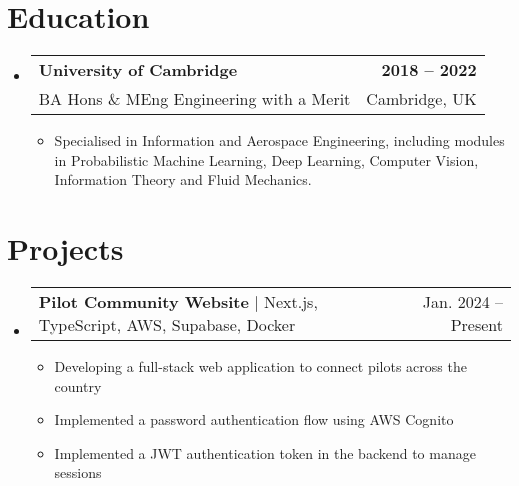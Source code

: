\documentclass[letterpaper,10pt]{article}
\makeatletter
\newcommand{\resumeItem}[1]{
  \item\small{
    {#1 \vspace{-2pt}}
  }
}
\newcommand{\educationItem}[4]{
  \vspace{-2pt}
  \item
  \begin{tabular*}{0.97\textwidth}[t]{l@{\extracolsep{\fill}}r}
    \textbf{#1} & \textbf{#2} \\
    \small#3 & \small#4
  \end{tabular*}\vspace{-7pt}
}
\newcommand{\resumeProjectHeading}[2]{
    \item
    \begin{tabular*}{0.97\textwidth}{l@{\extracolsep{\fill}}r}
      \small#1 & #2 \\
    \end{tabular*}\vspace{-7pt}
}
\newcommand{\resumeSubHeadingListStart}{\begin{itemize}[leftmargin=0.15in, label={}]}
\newcommand{\resumeSubHeadingListEnd}{\end{itemize}}
\newcommand{\resumeItemListStart}{\begin{itemize}}
\newcommand{\resumeItemListEnd}{\end{itemize}\vspace{-5pt}}
\makeatother
\begin{document}
\section{Education}
  \resumeSubHeadingListStart
    \educationItem
      {University of Cambridge}
      {2018 -- 2022}
      {BA Hons \& MEng Engineering with a Merit}
      {Cambridge, UK}
    \resumeItemListStart
      \resumeItem{Specialised in Information and Aerospace Engineering, including modules in Probabilistic Machine Learning, Deep Learning, Computer Vision, Information Theory and Fluid Mechanics.}
    \resumeItemListEnd
  \resumeSubHeadingListEnd

  \section{Projects}
  \resumeSubHeadingListStart
    \resumeProjectHeading
        {\textbf{Pilot Community Website} $|$ Next.js, TypeScript, AWS, Supabase, Docker}{Jan. 2024 -- Present}
        \resumeItemListStart
          \resumeItem{Developing a full-stack web application to connect pilots across the country}
          \resumeItem{Implemented a password authentication flow using AWS Cognito}
          \resumeItem{Implemented a JWT authentication token in the backend to manage sessions}
        \resumeItemListEnd
  \resumeSubHeadingListEnd

\end{document}
